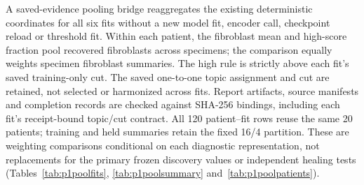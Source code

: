 A saved-evidence pooling bridge reaggregates the existing deterministic coordinates for all six fits without a new model fit, encoder call, checkpoint reload or threshold fit. Within each patient, the fibroblast mean and high-score fraction pool recovered fibroblasts across specimens; the comparison equally weights specimen fibroblast summaries. The high rule is strictly above each fit's saved training-only cut. The saved one-to-one topic assignment and cut are retained, not selected or harmonized across fits. Report artifacts, source manifests and completion records are checked against SHA-256 bindings, including each fit's receipt-bound topic/cut contract. All 120 patient--fit rows reuse the same 20 patients; training and held summaries retain the fixed 16/4 partition. These are weighting comparisons conditional on each diagnostic representation, not replacements for the primary frozen discovery values or independent healing tests (Tables~\ref{tab:p1poolfits}, \ref{tab:p1poolsummary} and~\ref{tab:p1poolpatients}).

